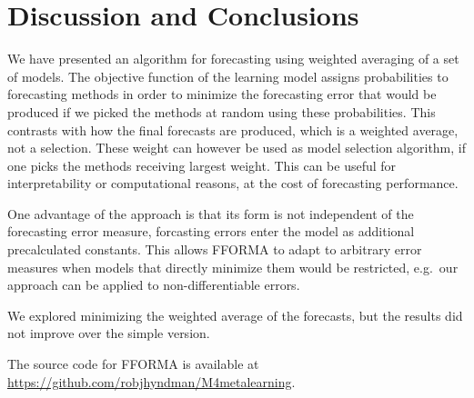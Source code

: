 \documentclass[11pt,a4paper,]{article}
\theoremstyle{definition}
\theoremstyle{definition}
\theoremstyle{definition}
\theoremstyle{remark}
\begin{document}
\section{Discussion and Conclusions}\label{conclusion}

We have presented an algorithm for forecasting using weighted averaging
of a set of models. The objective function of the learning model assigns
probabilities to forecasting methods in order to minimize the
forecasting error that would be produced if we picked the methods at
random using these probabilities. This contrasts with how the final
forecasts are produced, which is a weighted average, not a selection.
These weight can however be used as model selection algorithm, if one
picks the methods receiving largest weight. This can be useful for
interpretability or computational reasons, at the cost of forecasting
performance.

One advantage of the approach is that its form is not independent of the
forecasting error measure, forcasting errors enter the model as
additional precalculated constants. This allows FFORMA to adapt to
arbitrary error measures when models that directly minimize them would
be restricted, e.g.~our approach can be applied to non-differentiable
errors.

We explored minimizing the weighted average of the forecasts, but the
results did not improve over the simple version.

The source code for FFORMA is available at
\url{https://github.com/robjhyndman/M4metalearning}.

\printbibliography[title=References]
\end{document}
